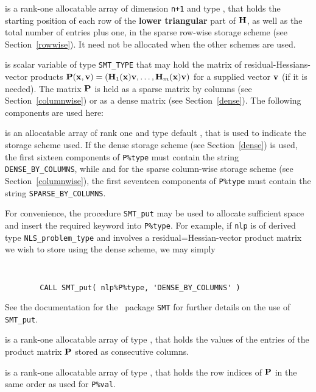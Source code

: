 \documentclass{galahad}
\newcommand{\packagename}{NLS}
\begin{document}
\begin{description}
\begin{description}
 is a rank-one allocatable array of dimension {\tt n+1} and type
\integer, that holds the starting position of
each row of the {\bf lower triangular} part of ${\mathbf{H}}$, as well
as the total number of entries plus one, in the sparse row-wise storage
scheme (see Section~\ref{rowwise}). It need not be allocated when the
other schemes are used.

\end{description}

 is scalar variable of type {\tt SMT\_TYPE}
that may hold the matrix of residual-Hessians-vector products
${\mathbf{P}}({\mathbf{x}},{\mathbf{v}}) = ({\mathbf{H}}_1({\mathbf{x}}) {\mathbf{v}}, \ldots, {\mathbf{H}}_m({\mathbf{x}}) {\mathbf{v}})$
for a supplied vector ${\mathbf{v}}$ (if it is needed).
The matrix ${\mathbf{P}}$ is held as a
sparse matrix by columns (see Section~\ref{columnwise}) or as a
dense matrix (see Section~\ref{dense}).
The following components are used here:

\begin{description}

 is an allocatable array of rank one and type default
\character, that
is used to indicate the storage scheme used. If the dense storage scheme
(see Section~\ref{dense}) is used,
the first sixteen components of {\tt P\%type} must contain the
string {\tt DENSE\_BY\_COLUMNS}, while
and for the sparse column-wise storage scheme (see Section~\ref{columnwise}),
the first seventeen components of {\tt P\%type} must contain the
string {\tt SPARSE\_BY\_COLUMNS}.

For convenience, the procedure {\tt SMT\_put}
may be used to allocate sufficient space and insert the required keyword
into {\tt P\%type}.
For example, if {\tt nlp} is of derived type {\tt \packagename\_problem\_type}
and involves a residual=Hessian-vector product matrix we wish to store
using the dense scheme,
we may simply
{\tt
\begin{verbatim}
        CALL SMT_put( nlp%P%type, 'DENSE_BY_COLUMNS' )
\end{verbatim}
}
\noindent
See the documentation for the \galahad\ package {\tt SMT}
for further details on the use of {\tt SMT\_put}.

 is a rank-one allocatable array of type \realdp,
that holds the values of the entries of the product matrix ${\mathbf{P}}$ stored
as consecutive columns.

 is a rank-one allocatable array of type \integer,
that holds the row indices of ${\mathbf{P}}$ in the same order as used for
{\tt P\%val}.


\end{description}
\end{description}
\end{document}
